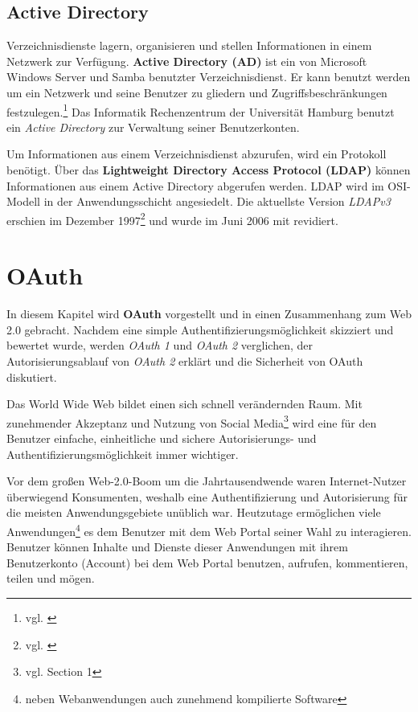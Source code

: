 \documentclass[12pt,a4paper,pointednumbers,abstracton]{scrartcl}
\begin{document}
\subsection{Active Directory}

Verzeichnisdienste lagern, organisieren und stellen Informationen in einem Netzwerk zur Verfügung.
\textbf{Active Directory (AD)} ist ein von Microsoft Windows Server und Samba benutzter Verzeichnisdienst.
Er kann benutzt werden um ein Netzwerk und seine Benutzer zu gliedern und Zugriffsbeschränkungen festzulegen.\footnote{vgl. \cite[Chapter 1]{Po09}}
Das Informatik Rechenzentrum der Universität Hamburg benutzt ein \emph{Active Directory} zur Verwaltung seiner Benutzerkonten.

Um Informationen aus einem Verzeichnisdienst abzurufen, wird ein Protokoll benötigt.
Über das \textbf{Lightweight Directory Access Protocol (LDAP)} können Informationen aus einem Active Directory abgerufen werden.
LDAP wird im OSI-Modell in der Anwendungsschicht angesiedelt.
Die aktuellste Version \emph{LDAPv3} erschien im Dezember 1997\footnote{vgl. \cite{2251}} und wurde im Juni 2006 mit \cite{RFC5246} revidiert.

\newpage
\section{OAuth}
\label{sec:oauth}

In diesem Kapitel wird \textbf{OAuth} vorgestellt und in einen Zusammenhang zum Web 2.0 gebracht.
Nachdem eine simple Authentifizierungsmöglichkeit skizziert und bewertet wurde, werden \emph{OAuth 1} und \emph{OAuth 2} verglichen, der Autorisierungsablauf von \emph{OAuth 2} erklärt und die Sicherheit von OAuth diskutiert.

Das World Wide Web bildet einen sich schnell verändernden Raum.
Mit zunehmender Akzeptanz und Nutzung von Social Media\footnote{vgl. \cite{KH10} Section 1} wird eine für den Benutzer einfache, einheitliche und sichere Autorisierungs- und Authentifizierungsmöglichkeit immer wichtiger.

Vor dem großen Web-2.0-Boom um die Jahrtausendwende waren Internet-Nutzer überwiegend Konsumenten, weshalb eine Authentifizierung und Autorisierung für die meisten Anwendungsgebiete unüblich war.
Heutzutage ermöglichen viele Anwendungen\footnote{neben Webanwendungen auch zunehmend kompilierte Software} es dem Benutzer mit dem Web Portal seiner Wahl zu interagieren.
Benutzer können Inhalte und Dienste dieser Anwendungen mit ihrem Benutzerkonto (Account) bei dem Web Portal benutzen, aufrufen, kommentieren, teilen und mögen.
\end{document}
